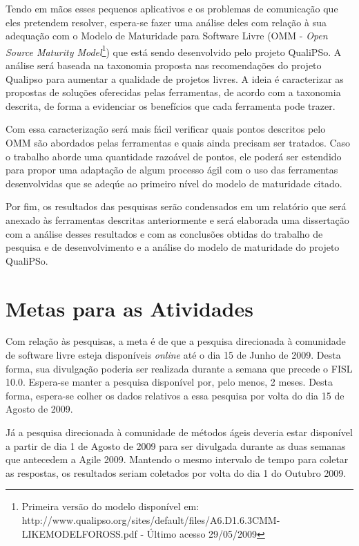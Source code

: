 Tendo em mãos esses pequenos aplicativos e os problemas de comunicação
que eles pretendem resolver, espera-se fazer uma análise deles com
relação à sua adequação com o Modelo de Maturidade para Software Livre
(OMM - \emph{Open Source Maturity Model}\footnote{Primeira versão do
  modelo disponível em:
  http://www.qualipso.org/sites/default/files/A6.D1.6.3CMM-LIKEMODELFOROSS.pdf
  - Último acesso 29/05/2009}) que está sendo desenvolvido pelo
projeto QualiPSo. A análise será baseada na taxonomia proposta nas
recomendações do projeto Qualipso \cite{Malheiros2009} para aumentar a
qualidade de projetos livres. A ideia é caracterizar as propostas de
soluções oferecidas pelas ferramentas, de acordo com a taxonomia
descrita, de forma a evidenciar os benefícios que cada ferramenta pode
trazer.

Com essa caracterização será mais fácil verificar quais pontos
descritos pelo OMM são abordados pelas ferramentas e quais ainda
precisam ser tratados. Caso o trabalho aborde uma quantidade razoável
de pontos, ele poderá ser estendido para propor uma adaptação de algum
processo ágil com o uso das ferramentas desenvolvidas que se adeqúe ao
primeiro nível do modelo de maturidade citado.

Por fim, os resultados das pesquisas serão condensados em um relatório
que será anexado às ferramentas descritas anteriormente e será
elaborada uma dissertação com a análise desses resultados e com as
conclusões obtidas do trabalho de pesquisa e de desenvolvimento e a
análise do modelo de maturidade do projeto QualiPSo.

\section{Metas para as Atividades}
\label{sec:cronograma}

Com relação às pesquisas, a meta é de que a pesquisa direcionada à
comunidade de software livre esteja disponíveis \emph{online} até o
dia 15 de Junho de 2009. Desta forma, sua divulgação poderia ser
realizada durante a semana que precede o FISL 10.0. Espera-se manter a
pesquisa disponível por, pelo menos, 2 meses. Desta forma, espera-se
colher os dados relativos a essa pesquisa por volta do dia 15 de
Agosto de 2009.

Já a pesquisa direcionada à comunidade de métodos ágeis deveria estar
disponível a partir de dia 1 de Agosto de 2009 para ser divulgada
durante as duas semanas que antecedem a Agile 2009. Mantendo o mesmo
intervalo de tempo para coletar as respostas, os resultados seriam
coletados por volta do dia 1 do Outubro 2009.

